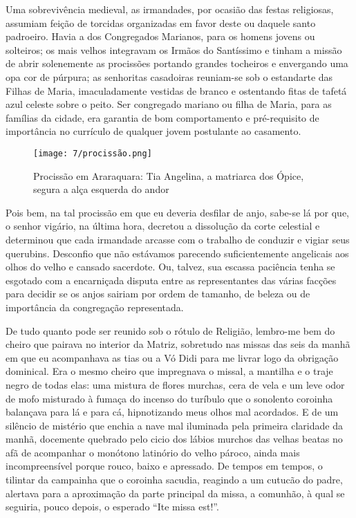 Uma sobrevivência medieval, as irmandades, por ocasião das festas religiosas, assumiam feição de torcidas organizadas em favor deste ou daquele santo padroeiro. Havia a dos Congregados Marianos, para os homens jovens ou solteiros; os mais velhos integravam os Irmãos do Santíssimo e tinham a missão de abrir solenemente as procissões portando grandes tocheiros e envergando uma opa cor de púrpura; as senhoritas casadoiras reuniam-se sob o estandarte das Filhas de Maria, imaculadamente vestidas de branco e ostentando fitas de tafetá azul celeste sobre o peito. 
Ser congregado mariano ou filha de Maria, para as famílias da cidade, era garantia de bom comportamento e pré-requisito de importância no currículo de qualquer jovem postulante ao casamento. 

\begin{figure}[H]
\centering
\texttt{[image: 7/procissão.png]}
\caption{Procissão em Araraquara: Tia Angelina, a matriarca dos Ópice, segura a alça esquerda do andor}
\end{figure}

Pois bem, na tal procissão em que eu deveria desfilar de anjo, sabe-se lá por que, o senhor vigário, na última hora, decretou a dissolução da corte celestial e determinou que cada irmandade arcasse com o trabalho de conduzir e vigiar seus querubins. 
Desconfio que não estávamos parecendo suficientemente angelicais aos olhos do velho e cansado sacerdote. 
Ou, talvez, sua escassa paciência tenha se esgotado com a encarniçada disputa entre as representantes das várias facções para decidir se os anjos sairiam por ordem de tamanho, de beleza ou de importância da congregação representada. 

De tudo quanto pode ser reunido sob o rótulo de Religião, lembro-me bem do cheiro que pairava no interior da Matriz, sobretudo nas missas das seis da manhã em que eu acompanhava as tias ou a Vó Didi para me livrar logo da obrigação dominical. 
Era o mesmo cheiro que impregnava o missal, a mantilha e o traje negro de todas elas: uma mistura de flores murchas, cera de vela e um leve odor de mofo misturado à fumaça do incenso do turíbulo que o sonolento coroinha balançava para lá e para cá, hipnotizando meus olhos mal acordados.  
E de um silêncio de mistério que enchia a nave mal iluminada pela primeira claridade da manhã, docemente quebrado pelo cicio dos lábios murchos das velhas beatas no afã de acompanhar o monótono latinório do velho pároco, ainda mais incompreensível porque rouco, baixo e apressado. 
De tempos em tempos, o tilintar da campainha que o coroinha sacudia, reagindo a um cutucão do padre, alertava para a aproximação da parte principal da missa, a comunhão, à qual se seguiria, pouco depois, o esperado ``Ite missa est!''.

